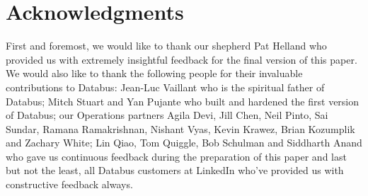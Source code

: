 \section{Acknowledgments}

First and foremost, we would like to thank our shepherd Pat Helland who provided us with extremely insightful feedback for the final version of this paper. We would also like to thank the following people for their invaluable contributions to Databus: Jean-Luc Vaillant who is the spiritual father of Databus; 
Mitch Stuart and Yan Pujante who built and hardened the first version of Databus; 
our Operations partners Agila Devi, Jill Chen, Neil Pinto, Sai Sundar, Ramana Ramakrishnan, Nishant Vyas, Kevin Krawez, Brian Kozumplik and Zachary White; 
Lin Qiao, Tom Quiggle, Bob Schulman and Siddharth Anand who gave us continuous feedback during the preparation of this paper and last but not the least, all Databus customers at LinkedIn who've provided us with constructive feedback always.

